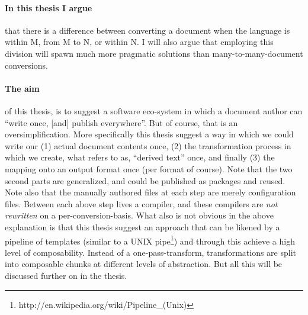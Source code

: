 \documentclass{scrreprt}
\begin{document}
\paragraph{In this thesis I argue} that there is a difference between converting a document when the language is within M, from M to N, or within N. I will also argue that employing this division will spawn much more pragmatic solutions than many-to-many-document conversions.

\paragraph{The aim} of this thesis, is to suggest a software eco-system in which a document author can ``write once, [and] publish everywhere''. But of course, that is an oversimplification. More specifically this thesis suggest a way in which we could write our (1) actual document contents once, (2) the transformation process in which we create, what \citet{reid} refers to as, ``derived text'' once, and finally (3) the mapping onto an output format once (per format of course). Note that the two second parts are generalized, and could be published as packages and reused. Note also that the manually authored files at each step are merely configuration files. Between each above step lives a compiler, and these compilers are \emph{not rewritten} on a per-conversion-basis. What also is not obvious in the above explanation is that this thesis suggest an approach that can be likened by a pipeline of templates (similar to a UNIX pipe\footnote{http://en.wikipedia.org/wiki/Pipeline\_(Unix)}) and through this achieve a high level of composability. Instead of a one-pass-transform, transformations are split into composable chunks at different levels of abstraction. But all this will be discussed further on in the thesis.






\end{document}
